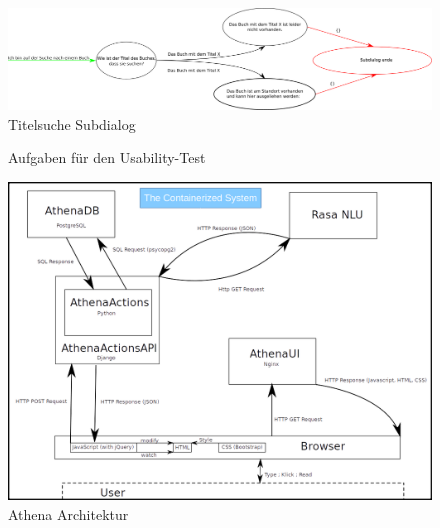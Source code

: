 \documentclass[12pt,a4paper]{article}
\begin{document}
\begin{figure}[ht]
    \centering
    \includegraphics[width=\textwidth]{subdialog_title.png}
    \caption{Titelsuche Subdialog}
    \label{fig:title_subdialog}
\end{figure}

\begin{figure}[h]
    \centering
    \caption{Aufgaben für den Usability-Test}
    \label{fig:questions}
\end{figure}

\begin{figure}[ht]
    \centering
    \includegraphics[width=\textwidth]{Athena_architecture.png}
    \caption{Athena Architektur}
    \label{fig:architecture_diagram}
\end{figure}
\end{document}

